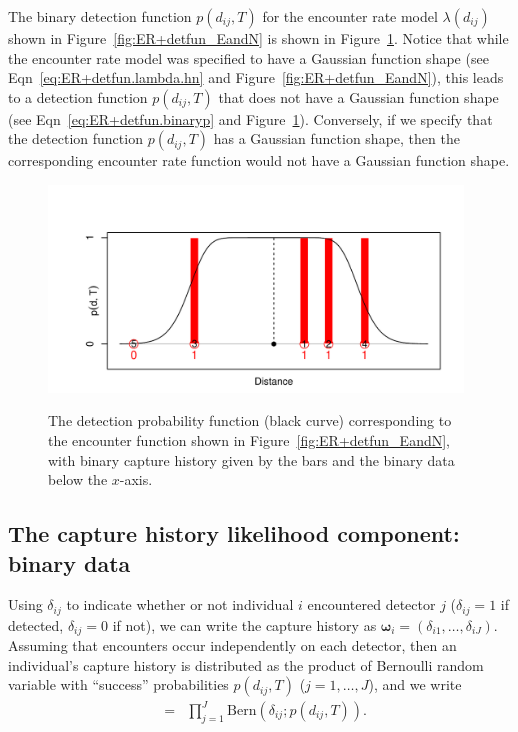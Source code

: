 \documentclass[graybox,envcountchap,sectrefs]{SpringerStyleFiles/styles/svmono}\usepackage[]{graphicx}\usepackage[]{color}
\newcommand{\be}{\begin{eqnarray}}
\newcommand{\ee}{\end{eqnarray}}
\begin{document}
\afterpage{\clearpage}

The binary detection function $p(d_{ij},T)$ for the encounter rate model $\lambda(d_{ij})$ shown in Figure~\ref{fig:ER+detfun_EandN} is shown in Figure~\ref{fig:ER+detfun_binp}. Notice that while the encounter rate model was specified to have a Gaussian function shape (see Eqn~\eqref{eq:ER+detfun.lambda.hn} and Figure~\ref{fig:ER+detfun_EandN}), this leads to a detection function $p(d_{ij},T)$ that does not have a Gaussian function shape (see Eqn~\eqref{eq:ER+detfun.binaryp} and Figure~\ref{fig:ER+detfun_binp}). Conversely, if we specify that the detection function $p(d_{ij},T)$ has a Gaussian function shape, then the corresponding encounter rate function would not have a Gaussian function shape.

\begin{figure}[ht]
\caption{\small The detection probability function (black curve) corresponding to the encounter function shown in Figure~\ref{fig:ER+detfun_EandN}, with binary capture history given by the bars and the binary data below the $x$-axis.}
\centering
\vspace{-24pt}
\includegraphics[width=11cm]{keepfigure/binp.pdf}
\label{fig:ER+detfun_binp}
\end{figure}


\subsection{The capture history likelihood component: binary data}
\label{subsec:ER+detfun.binarylikelihood}

Using $\delta_{ij}$ to indicate whether or not individual $i$ encountered detector $j$ ($\delta_{ij}=1$ if detected, $\delta_{ij}=0$ if not), we can write the capture history as $\bm{\omega}_i=(\delta_{i1},\ldots,\delta_{iJ})$. Assuming that encounters occur independently on each detector, then an individual's capture history is distributed as the product of Bernoulli random variable with ``success'' probabilities $p(d_{ij},T)$ ($j=1,\ldots,J$), and we write
\be
[\bm{\omega}_i|\bm{s}_i]&=&\prod_{j=1}^J\mbox{Bern}\left(\delta_{ij};p(d_{ij},T)\right).
\ee
\end{document}
